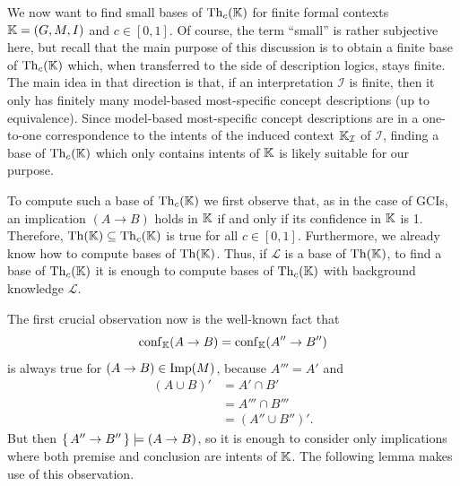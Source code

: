 We now want to find small bases of $\operatorname{Th}_c({\mathbb{K}})$ for finite formal contexts ${\mathbb{K}} =
(G, M, I)$ and $c \in [0,1]$.  Of course, the term \enquote{small} is rather subjective
here, but recall that the main purpose of this discussion is to obtain a finite base of
$\operatorname{Th}_c({\mathbb{K}})$ which, when transferred to the side of description logics, stays finite.
The main idea in that direction is that, if an interpretation $\mathcal{I}$ is finite,
then it only has finitely many model-based most-specific concept descriptions (up to
equivalence).  Since model-based most-specific concept descriptions are in a one-to-one
correspondence to the intents of the induced context ${\mathbb{K}}_{\mathcal{I}}$ of
$\mathcal{I}$, finding a base of $\operatorname{Th}_c({\mathbb{K}})$ which only contains intents of ${\mathbb{K}}$
is likely suitable for our purpose.

To compute such a base of $\operatorname{Th}_c({\mathbb{K}})$ we first observe that, as in the case of GCIs,
an implication $(A \to B)$ holds in ${\mathbb{K}}$ if and only if its confidence in ${\mathbb{K}}$ is
1.  Therefore, $\operatorname{Th}({\mathbb{K}}) \subseteq \operatorname{Th}_c({\mathbb{K}})$ is true for all $c \in [0,1]$.
Furthermore, we already know how to compute bases of $\operatorname{Th}({\mathbb{K}})$.  Thus, if
$\mathcal{L}$ is a base of $\operatorname{Th}({\mathbb{K}})$, to find a base of $\operatorname{Th}_c({\mathbb{K}})$ it is enough
to compute bases of $\operatorname{Th}_c({\mathbb{K}})$ with background knowledge $\mathcal{L}$.

The first crucial observation now is the well-known fact that
\begin{equation*}
  \operatorname{conf}_{{\mathbb{K}}}(A \to B) = \operatorname{conf}_{{\mathbb{K}}}(A'' \to B'')
\end{equation*}
is always true for $(A \to B) \in \operatorname{Imp}(M)$, because $A''' = A'$ and
\begin{align*}
  (A \cup B)' &= A' \cap B' \\
  &= A''' \cap B'''\\
  &= (A'' \cup B'')'.
\end{align*}
But then ${\{\, A'' \to B'' \,\}} \models (A \to B)$, so it is enough to consider only
implications where both premise and conclusion are intents of ${\mathbb{K}}$.  The following
lemma makes use of this observation.

